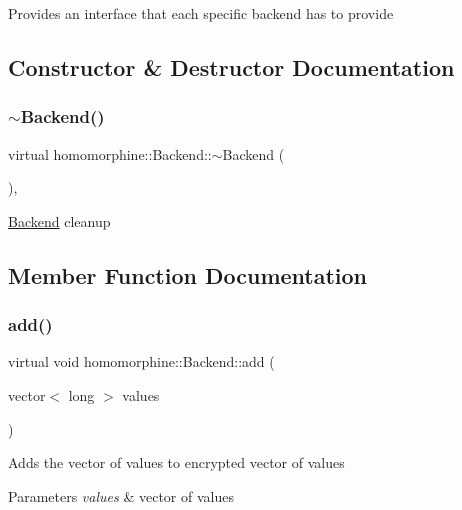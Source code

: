 Provides an interface that each specific backend has to provide 

\subsection{Constructor \& Destructor Documentation}
\mbox{\label{classhomomorphine_1_1_backend_a24577dcf41802199e2286a4378214cd5}} 
\subsubsection{\texorpdfstring{$\sim$Backend()}{~Backend()}}
{\footnotesize\ttfamily virtual homomorphine\+::\+Backend\+::$\sim$\+Backend (\begin{DoxyParamCaption}{ }\end{DoxyParamCaption})\hspace{0.3cm}{\ttfamily [inline]}, {\ttfamily [virtual]}}

\mbox{\hyperlink{classhomomorphine_1_1_backend}{Backend}} cleanup 

\subsection{Member Function Documentation}
\mbox{\label{classhomomorphine_1_1_backend_ae381fb973ade6dd6a5caf8f6785e165e}} 
\subsubsection{\texorpdfstring{add()}{add()}\hspace{0.1cm}{\footnotesize\ttfamily [1/2]}}
{\footnotesize\ttfamily virtual void homomorphine\+::\+Backend\+::add (\begin{DoxyParamCaption}\item[{vector$<$ long $>$}]{values }\end{DoxyParamCaption})\hspace{0.3cm}{\ttfamily [pure virtual]}}

Adds the vector of values to encrypted vector of values


\begin{DoxyParams}{Parameters}
{\em values} & vector of values \\
\hline
\end{DoxyParams}


